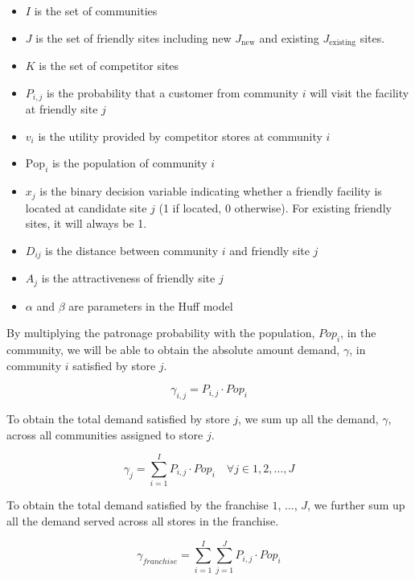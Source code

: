\documentclass{ecai}
\begin{document}
\begin{itemize}
\item $I$ is the set of communities
\item $J$ is the set of friendly sites including new $J_{\text{new}}$ and existing $J_{\text{existing}}$ sites.
\item $K$ is the set of competitor sites
\item $P_{i,j}$ is the probability that a customer from community $i$ will visit the facility at friendly site $j$
\item $v_i$ is the utility provided by competitor stores at community $i$
\item $\text{Pop}_i$ is the population of community $i$
\item $x_j$ is the binary decision variable indicating whether a friendly facility is located at candidate site $j$ (1 if located, 0 otherwise). For existing friendly sites, it will always be 1.
\item $D_{ij}$ is the distance between community $i$ and friendly site $j$
\item $A_j$ is the attractiveness of friendly site $j$
\item $\alpha$ and $\beta$ are parameters in the Huff model
\end{itemize}

By multiplying the patronage probability with the population, $Pop_i$, in the community, we will be able to obtain the absolute amount demand, $\gamma$, in community $i$ satisfied by store $j$. 

\begin{equation}
\gamma_{i,j} = P_{i,j} \cdot Pop_i \label{eq:storelevelhuff}
\end{equation}

To obtain the total demand satisfied by store $j$, we sum up all the demand, $\gamma$, across all communities assigned to store $j$. 

\begin{equation}
\gamma_j = \sum_{i=1}^I P_{i,j} \cdot Pop_i \quad \forall j \in {1, 2, \ldots, J}
\end{equation}

To obtain the total demand satisfied by the franchise  $1$, ..., $J$, we further sum up all the demand served across all stores in the franchise. 

\begin{equation}
\gamma_{franchise} = \sum_{i=1}^I\sum_{j=1}^J P_{i,j} \cdot Pop_i
\end{equation}
\end{document}
